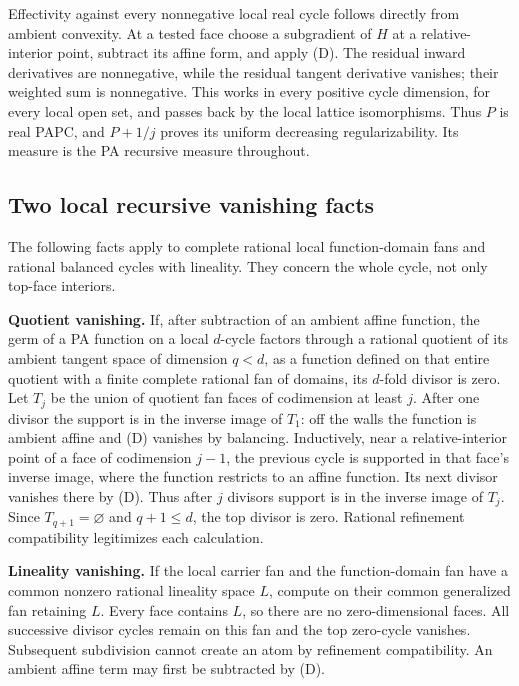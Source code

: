 \documentclass[
  11pt,
]{article}
\begin{document}
Effectivity against every nonnegative local real cycle follows directly
from ambient convexity. At a tested face choose a subgradient of \(H\)
at a relative-interior point, subtract its affine form, and apply (D).
The residual inward derivatives are nonnegative, while the residual
tangent derivative vanishes; their weighted sum is nonnegative. This
works in every positive cycle dimension, for every local open set, and
passes back by the local lattice isomorphisms. Thus \(P\) is real PAPC,
and \(P+1/j\) proves its uniform decreasing regularizability. Its
measure is the PA recursive measure throughout.

\subsection{Two local recursive vanishing
facts}\label{two-local-recursive-vanishing-facts}

The following facts apply to complete rational local function-domain
fans and rational balanced cycles with lineality. They concern the whole
cycle, not only top-face interiors.

\textbf{Quotient vanishing.} If, after subtraction of an ambient affine
function, the germ of a PA function on a local \(d\)-cycle factors
through a rational quotient of its ambient tangent space of dimension
\(q<d\), as a function defined on that entire quotient with a finite
complete rational fan of domains, its \(d\)-fold divisor is zero. Let
\(T_j\) be the union of quotient fan faces of codimension at least
\(j\). After one divisor the support is in the inverse image of \(T_1\):
off the walls the function is ambient affine and (D) vanishes by
balancing. Inductively, near a relative-interior point of a face of
codimension \(j-1\), the previous cycle is supported in that face's
inverse image, where the function restricts to an affine function. Its
next divisor vanishes there by (D). Thus after \(j\) divisors support is
in the inverse image of \(T_j\). Since \(T_{q+1}=\varnothing\) and
\(q+1\leq d\), the top divisor is zero. Rational refinement
compatibility legitimizes each calculation.

\textbf{Lineality vanishing.} If the local carrier fan and the
function-domain fan have a common nonzero rational lineality space
\(L\), compute on their common generalized fan retaining \(L\). Every
face contains \(L\), so there are no zero-dimensional faces. All
successive divisor cycles remain on this fan and the top zero-cycle
vanishes. Subsequent subdivision cannot create an atom by refinement
compatibility. An ambient affine term may first be subtracted by (D).
\end{document}
